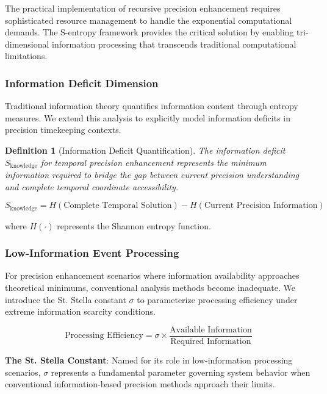 \documentclass[12pt,a4paper]{article}
\newtheorem{definition}[theorem]{Definition}
\begin{document}
{{{{{{{{{{{{{The practical implementation of recursive precision enhancement requires sophisticated resource management to handle the exponential computational demands. The S-entropy framework provides the critical solution by enabling tri-dimensional information processing that transcends traditional computational limitations.

\subsubsection{Information Deficit Dimension}

Traditional information theory quantifies information content through entropy measures. We extend this analysis to explicitly model information deficits in precision timekeeping contexts.

\begin{definition}[Information Deficit Quantification]
The information deficit $S_{\text{knowledge}}$ for temporal precision enhancement represents the minimum information required to bridge the gap between current precision understanding and complete temporal coordinate accessibility.
\end{definition}

\begin{equation}
S_{\text{knowledge}} = H(\text{Complete Temporal Solution}) - H(\text{Current Precision Information})
\label{eq:information_deficit}
\end{equation}

where $H(\cdot)$ represents the Shannon entropy function.

\subsubsection{Low-Information Event Processing}

For precision enhancement scenarios where information availability approaches theoretical minimums, conventional analysis methods become inadequate. We introduce the St. Stella constant $\sigma$ to parameterize processing efficiency under extreme information scarcity conditions.

\begin{equation}
\text{Processing Efficiency} = \sigma \times \frac{\text{Available Information}}{\text{Required Information}}
\label{eq:stella_constant}
\end{equation}

\textbf{The St. Stella Constant}: Named for its role in low-information processing scenarios, $\sigma$ represents a fundamental parameter governing system behavior when conventional information-based precision methods approach their limits.

}}}}}}}}}}}}}
\end{document}
